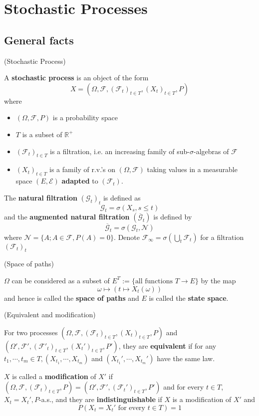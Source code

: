 \newcommand{\F}{\mathcal{F}}
\newcommand{\PR}{\mathbb{R}^+}
\newcommand{\G}{\mathcal{G}}
\newcommand{\Borel}{\mathcal{B}}

\section{Stochastic Processes}

\subsection{General facts}

\begin{definition}
    (Stochastic Process)\par
    A \textbf{stochastic process} is an object of the form
    \[
    X = (\Omega,\F,(\F_t)_{t\in T}, (X_t)_{t\in T},P)
    \]
    where
    \begin{itemize}
        \item $(\Omega,\F,P)$ is a probability space
        \item $T$ is a subset of $\PR$
        \item $(\F_t)_{t\in T}$ is a filtration, i.e. an increasing family of sub-$\sigma$-algebras of $\F$
        \item $(X_t)_{t\in T}$ is a family of r.v.'s on $(\Omega,\F)$ taking values in a measurable space $(E,\mathcal{E})$ \textbf{adapted} to $(\F_t)$.
    \end{itemize}
    The \textbf{natural filtration} $(\G_t)_t$ is defined as
    \[\G_t = \sigma(X_s,s\leq t)\]
    and the \textbf{augmented natural filtration} $(\overline{\G}_t)$ is defined by
    \[
    \overline{\G}_t = \sigma(\G_t,\mathcal{N})
    \]
    where $\mathcal{N} = \{A;A\in \F,P(A) = 0\}$. Denote $\F_{\infty} = \sigma(\bigcup_t \F_t)$ for a filtration $(\F_t)_t$
\end{definition}

\begin{definition}
    (Space of paths)\par
    $\Omega$ can be considered as a subset of $E^T:=\{\text{all functions }T\to E\}$ by the map \[\omega\mapsto(t\mapsto X_t(\omega))\]
    and hence is called the \textbf{space of paths} and $E$ is called the \textbf{state space}.
\end{definition}

\begin{definition}
    (Equivalent and modification)\par
    For two processes $(\Omega,\F,(\F_t)_{t\in T}, (X_t)_{t\in T},P)$ and $ (\Omega',\F',(\F'_t)_{t\in T}, (X_t')_{t\in T},P')$, they are \textbf{equivalent} if for any $t_1,\cdots,t_m\in T,(X_{t_1},\cdots,X_{t_m})$ and $(X_{t_1}',\cdots,X_{t_m}')$ have the same law.\par
    $X$ is called a \textbf{modification} of $X'$ if $(\Omega,\F,(\F_t)_{t\in T},P) = (\Omega',\F',(\F_t')_{t\in T},P')$ and for every $t\in T$, $X_t = X_t', P$-a.s., and they are \textbf{indistinguishable} if $X$ is a modification of $X'$ and 
    \[P(X_t = X_t'\text{ for every }t\in T) = 1\]
\end{definition}

